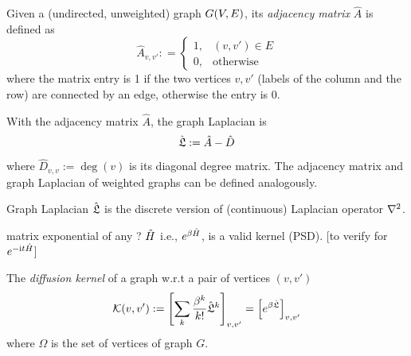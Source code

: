 \begin{definition}\label{def:adjacency_matrix}
	Given a (undirected, unweighted) graph $G(V,E)$, its \emph{adjacency matrix} $\hat{A}$ is defined as
	\begin{equation}
		\hat{A}_{v,v'} : = 
		\begin{cases}
			1, & (v,v') \in E \\
			0, & \text{otherwise}
		\end{cases}
	\end{equation}
	where the matrix entry is 1 if the two vertices $v,v'$ (labels of the column and the row) are connected by an edge, otherwise the entry is 0.
\end{definition}
\begin{definition}\label{def:graph_laplacian}
	With the adjacency matrix $\hat{A}$, the graph Laplacian is
	\begin{equation}
		\hat{\mathfrak{L}}:=\hat{A}-\hat{D}	
	\end{equation}
	where $\hat{D}_{v,v}:=\deg(v)$ is its diagonal degree matrix.
	The adjacency matrix and graph Laplacian of weighted graphs can be defined analogously.
\end{definition}
\begin{remark}
	Graph Laplacian $\hat{\mathfrak{L}}$ is the 
	discrete version of (continuous) Laplacian operator $\laplacian$.
	\cite{chungSpectralGraphTheory1997}
\end{remark}
\begin{lemma}
	matrix exponential of any ? $\hat{H}$ i.e., $e^{\beta \hat{H}}$, is a valid kernel (PSD). [to verify for $e^{-\textup{i} t\hat{H}}$]
\end{lemma}
\begin{definition}\label{def:diffusion_kernel}
	The \emph{diffusion kernel} of a graph w.r.t a pair of vertices $(v,v')$
	\begin{equation}
		\mathcal{K}(v,v') := 
		\qty[\sum_{k}\frac{\beta^k}{k!}\hat{\mathfrak{L}}^k]_{v,v'}  =
		\qty[e^{\beta \hat{\mathfrak{L}}}]_{v,v'} 
	\end{equation}
	where $\Omega$ is the set of vertices of graph $G$.
\end{definition}


